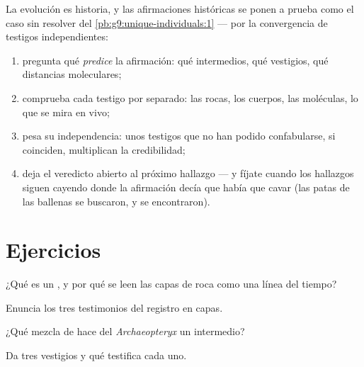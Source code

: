 \begin{method}\label{met:g9:evidence-of-evolution:weigh}
La evolución es historia, y las afirmaciones históricas se ponen a
prueba como el caso sin resolver del
\cref{pb:g9:unique-individuals:1} --- por la convergencia de testigos
independientes:
\begin{enumerate}
  \item pregunta qué \emph{predice} la afirmación: qué intermedios, qué
        vestigios, qué distancias moleculares;
  \item comprueba cada testigo por separado: las rocas, los cuerpos,
        las moléculas, lo que se mira en vivo;
  \item pesa su independencia: unos testigos que no han podido
        confabularse, si coinciden, multiplican la credibilidad;
  \item deja el veredicto abierto al próximo hallazgo --- y fíjate
        cuando los hallazgos siguen cayendo donde la afirmación decía
        que había que cavar (las patas de las ballenas se buscaron, y
        se encontraron).
\end{enumerate}
\end{method}

\section{Ejercicios}

\begin{exercise}[$\star$]\label{exo:g9:evidence-of-evolution:1}
¿Qué es un , y por qué se leen las capas de roca como una línea
del tiempo?
\end{exercise}

\begin{exercise}[$\star$]\label{exo:g9:evidence-of-evolution:2}
Enuncia los tres testimonios del registro en capas.
\end{exercise}

\begin{exercise}[$\star$]\label{exo:g9:evidence-of-evolution:3}
¿Qué mezcla de  hace del \emph{Archaeopteryx} un intermedio?
\end{exercise}

\begin{exercise}[$\star$]\label{exo:g9:evidence-of-evolution:4}
Da tres vestigios y qué testifica cada uno.
\end{exercise}

